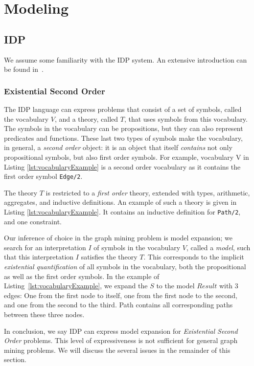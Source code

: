 \section{Modeling}\label{sec:modeling}
\subsection{IDP}
We assume some familiarity with the IDP system.
An extensive introduction can be found in~\cite{}.
\subsubsection{Existential Second Order}
The IDP language can express problems that consist of a set of symbols, called the vocabulary $V$, and a theory, called $T$, that uses symbols from this vocabulary.
The symbols in the vocabulary can be propositions, but they can also represent predicates and functions.
These last two types of symbols make the vocabulary, in general, a \emph{second order} object: it is an object that itself \emph{contains} not only propositional symbols, but also first order symbols.
For example, vocabulary V in Listing \ref{lst:vocabularyExample} is a second order vocabulary as it contains the first order symbol \lstinline{Edge/2}.

The theory $T$ is restricted to a \emph{first order} theory, extended with types, arithmetic, aggregates, and inductive definitions.
An example of such a theory is given in Listing \ref{lst:vocabularyExample}.
It contains an inductive definition for \lstinline{Path/2}, and one constraint.

Our inference of choice in the graph mining problem is model expansion; we search for an interpretation $I$ of symbols in the vocabulary $V$, called a \emph{model}, such that this interpretation $I$ satisfies the theory $T$.
This corresponds to the implicit \emph{existential quantification} of all symbols in the vocabulary, both the propositional as well as the first order symbols.
In the example of Listing~\ref{lst:vocabularyExample}, we expand the $S$ to the model $Result$ with 3 edges: One from the first node to itself, one from the first node to the second, and one from the second to the third.
Path contains all corresponding paths between these three nodes.

In conclusion, we say IDP can express model expansion for \emph{Existential Second Order} problems.
This level of expressiveness is not sufficient for general graph mining problems.
We will discuss the several issues in the remainder of this section.


